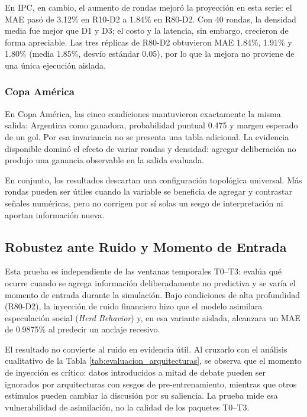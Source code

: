 \documentclass{article}
\begin{document}
En IPC, en cambio, el aumento de rondas mejoró la proyección en esta serie: el MAE pasó de 3.12\% en R10-D2 a 1.84\% en R80-D2. Con 40 rondas, la densidad media fue mejor que D1 y D3; el costo y la latencia, sin embargo, crecieron de forma apreciable. Las tres réplicas de R80-D2 obtuvieron MAE 1.84\%, 1.91\% y 1.80\% (media 1.85\%, desvío estándar 0.05), por lo que la mejora no proviene de una única ejecución aislada.

\subsubsection{Copa América}

En Copa América, las cinco condiciones mantuvieron exactamente la misma salida: Argentina como ganadora, probabilidad puntual 0.475 y margen esperado de un gol. Por esa invariancia no se presenta una tabla adicional. La evidencia disponible dominó el efecto de variar rondas y densidad: agregar deliberación no produjo una ganancia observable en la salida evaluada.

En conjunto, los resultados descartan una configuración topológica universal. Más rondas pueden ser útiles cuando la variable se beneficia de agregar y contrastar señales numéricas, pero no corrigen por sí solas un sesgo de interpretación ni aportan información nueva.

\subsection{Robustez ante Ruido y Momento de Entrada}

Esta prueba es independiente de las ventanas temporales T0--T3: evalúa qué ocurre cuando se agrega información deliberadamente no predictiva y se varía el momento de entrada durante la simulación. Bajo condiciones de alta profundidad (R80-D2), la inyección de ruido financiero hizo que el modelo asimilara especulación social (\textit{Herd Behavior}) y, en esa variante aislada, alcanzara un MAE de 0.9875\% al predecir un anclaje recesivo.

El resultado no convierte al ruido en evidencia útil. Al cruzarlo con el análisis cualitativo de la Tabla \ref{tab:evaluacion_arquitecturas}, se observa que el momento de inyección es crítico: datos introducidos a mitad de debate pueden ser ignorados por arquitecturas con sesgos de pre-entrenamiento, mientras que otros estímulos pueden cambiar la discusión por su saliencia. La prueba mide esa vulnerabilidad de asimilación, no la calidad de los paquetes T0--T3.
\end{document}
